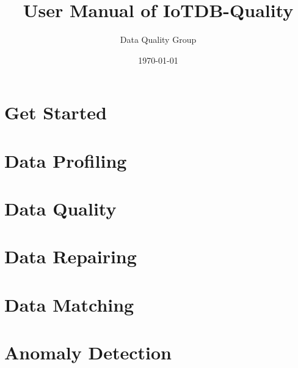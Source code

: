 \documentclass[11pt,color=green,table]{elegantbook}
\title{User Manual of IoTDB-Quality}
\author{Data Quality Group}
\institute{School of Software, Tsinghua University}
\date{\today}
\begin{document}
\maketitle
\tableofcontents
\mainmatter

\chapter{Get Started}




\chapter{Data Profiling}















\chapter{Data Quality}





\chapter{Data Repairing}





\chapter{Data Matching}








\chapter{Anomaly Detection}



\end{document}
